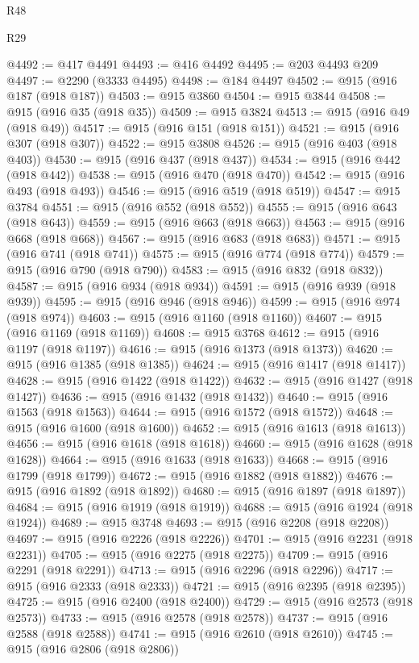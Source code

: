 \begin{lexlean}{R48}
\begin{lexlean}{R29}
\begin{coremodule}
{{{{{{{{{{{{{{{{{{{{{{{{{{{{{{{{{{{{{{{{{{{{{{{{{{{{{{{{{{{{{{{{{{{{{{{{{{{{{{{{{{{{{{{{{{{{{{{{{{{{{{{{{{{{{{{{{{{{{{{{{{{{{{{{{{{{{{{{{{{{{{{{{{{{{{{{{{{{{{{{{{{{{{{{{{{{{{{{{{{{{{{{{{{{{{{{{{{{{{{{{{{{{{{{{{{{{{{{{{@4492 := @417 @4491
@4493 := @416 @4492
@4495 := @203 @4493 @209
@4497 := @2290 (@3333 @4495)
@4498 := @184 @4497
@4502 := @915 (@916 @187 (@918 @187))
@4503 := @915 @3860
@4504 := @915 @3844
@4508 := @915 (@916 @35 (@918 @35))
@4509 := @915 @3824
@4513 := @915 (@916 @49 (@918 @49))
@4517 := @915 (@916 @151 (@918 @151))
@4521 := @915 (@916 @307 (@918 @307))
@4522 := @915 @3808
@4526 := @915 (@916 @403 (@918 @403))
@4530 := @915 (@916 @437 (@918 @437))
@4534 := @915 (@916 @442 (@918 @442))
@4538 := @915 (@916 @470 (@918 @470))
@4542 := @915 (@916 @493 (@918 @493))
@4546 := @915 (@916 @519 (@918 @519))
@4547 := @915 @3784
@4551 := @915 (@916 @552 (@918 @552))
@4555 := @915 (@916 @643 (@918 @643))
@4559 := @915 (@916 @663 (@918 @663))
@4563 := @915 (@916 @668 (@918 @668))
@4567 := @915 (@916 @683 (@918 @683))
@4571 := @915 (@916 @741 (@918 @741))
@4575 := @915 (@916 @774 (@918 @774))
@4579 := @915 (@916 @790 (@918 @790))
@4583 := @915 (@916 @832 (@918 @832))
@4587 := @915 (@916 @934 (@918 @934))
@4591 := @915 (@916 @939 (@918 @939))
@4595 := @915 (@916 @946 (@918 @946))
@4599 := @915 (@916 @974 (@918 @974))
@4603 := @915 (@916 @1160 (@918 @1160))
@4607 := @915 (@916 @1169 (@918 @1169))
@4608 := @915 @3768
@4612 := @915 (@916 @1197 (@918 @1197))
@4616 := @915 (@916 @1373 (@918 @1373))
@4620 := @915 (@916 @1385 (@918 @1385))
@4624 := @915 (@916 @1417 (@918 @1417))
@4628 := @915 (@916 @1422 (@918 @1422))
@4632 := @915 (@916 @1427 (@918 @1427))
@4636 := @915 (@916 @1432 (@918 @1432))
@4640 := @915 (@916 @1563 (@918 @1563))
@4644 := @915 (@916 @1572 (@918 @1572))
@4648 := @915 (@916 @1600 (@918 @1600))
@4652 := @915 (@916 @1613 (@918 @1613))
@4656 := @915 (@916 @1618 (@918 @1618))
@4660 := @915 (@916 @1628 (@918 @1628))
@4664 := @915 (@916 @1633 (@918 @1633))
@4668 := @915 (@916 @1799 (@918 @1799))
@4672 := @915 (@916 @1882 (@918 @1882))
@4676 := @915 (@916 @1892 (@918 @1892))
@4680 := @915 (@916 @1897 (@918 @1897))
@4684 := @915 (@916 @1919 (@918 @1919))
@4688 := @915 (@916 @1924 (@918 @1924))
@4689 := @915 @3748
@4693 := @915 (@916 @2208 (@918 @2208))
@4697 := @915 (@916 @2226 (@918 @2226))
@4701 := @915 (@916 @2231 (@918 @2231))
@4705 := @915 (@916 @2275 (@918 @2275))
@4709 := @915 (@916 @2291 (@918 @2291))
@4713 := @915 (@916 @2296 (@918 @2296))
@4717 := @915 (@916 @2333 (@918 @2333))
@4721 := @915 (@916 @2395 (@918 @2395))
@4725 := @915 (@916 @2400 (@918 @2400))
@4729 := @915 (@916 @2573 (@918 @2573))
@4733 := @915 (@916 @2578 (@918 @2578))
@4737 := @915 (@916 @2588 (@918 @2588))
@4741 := @915 (@916 @2610 (@918 @2610))
@4745 := @915 (@916 @2806 (@918 @2806))
}}}}}}}}}}}}}}}}}}}}}}}}}}}}}}}}}}}}}}}}}}}}}}}}}}}}}}}}}}}}}}}}}}}}}}}}}}}}}}}}}}}}}}}}}}}}}}}}}}}}}}}}}}}}}}}}}}}}}}}}}}}}}}}}}}}}}}}}}}}}}}}}}}}}}}}}}}}}}}}}}}}}}}}}}}}}}}}}}}}}}}}}}}}}}}}}}}}}}}}}}}}}}}}}}}}}}}}}}}
\end{coremodule}
\end{lexlean}
\end{lexlean}
